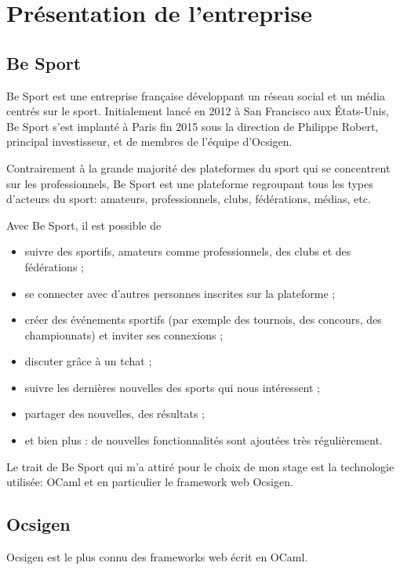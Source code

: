 \section{Présentation de l'entreprise}

\subsection{Be Sport}

Be Sport\cite{besport} est une entreprise française développant un réseau social
et un média centrés sur le sport. Initialement lancé en 2012 à San Francisco
aux États-Unis, Be Sport s'est implanté à Paris fin 2015 sous la
direction de Philippe Robert, principal investisseur, et de membres de l'équipe d'Ocsigen.

Contrairement à la grande majorité des plateformes du sport qui se concentrent
sur les professionnels, Be Sport est une plateforme regroupant tous les
types d'acteurs du sport: amateurs, professionnels, clubs, fédérations, médias,
etc.

Avec Be Sport, il est possible de

\begin{itemize}
  \item suivre des sportifs, amateurs comme professionnels, des clubs et des
    fédérations ;
  \item se connecter avec d'autres personnes inscrites sur la plateforme ;
  \item créer des événements sportifs (par exemple des tournois, des concours,
    des championnats) et inviter ses connexions ;
  \item discuter grâce à un tchat ;
  \item suivre les dernières nouvelles des sports qui nous intéressent ;
  \item partager des nouvelles, des résultats ;
  \item et bien plus : de nouvelles fonctionnalités sont ajoutées très régulièrement.
\end{itemize}

Le trait de Be Sport qui m'a attiré pour le choix de mon stage est la
technologie utilisée: OCaml et en particulier le framework web Ocsigen.

\subsection{Ocsigen}

Ocsigen\cite{ocsigen-website} est le plus connu des frameworks web écrit en
OCaml.

